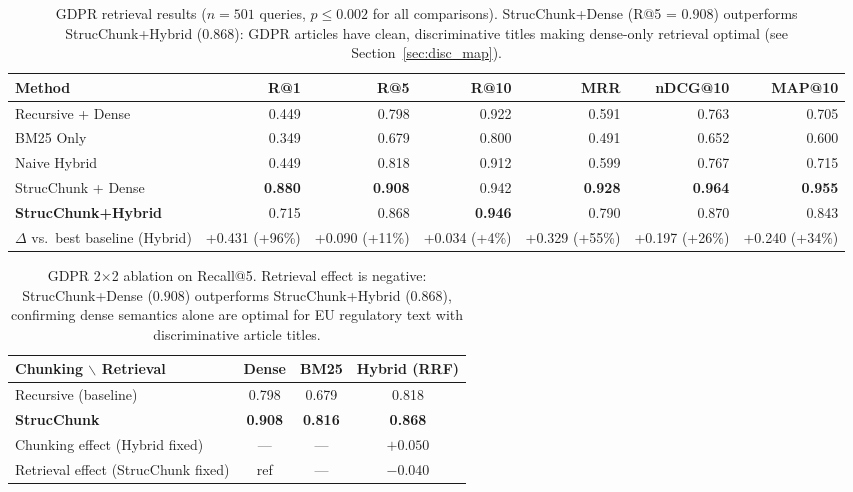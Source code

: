 \documentclass[sn-mathphys,Numbered]{sn-jnl}%
\begin{document}
\begin{table}[htbp]
\centering
\begin{adjustbox}{max width=\textwidth}
\begin{tabular}{lrrrrrr}
\toprule
\textbf{Method} & \textbf{R@1} & \textbf{R@5} & \textbf{R@10}
               & \textbf{MRR} & \textbf{nDCG@10} & \textbf{MAP@10} \\
\midrule
Recursive + Dense       & 0.449 & 0.798 & 0.922 & 0.591 & 0.763 & 0.705 \\
BM25 Only               & 0.349 & 0.679 & 0.800 & 0.491 & 0.652 & 0.600 \\
Naive Hybrid            & 0.449 & 0.818 & 0.912 & 0.599 & 0.767 & 0.715 \\
StrucChunk + Dense      & \textbf{0.880} & \textbf{0.908}
                        & 0.942 & \textbf{0.928}
                        & \textbf{0.964} & \textbf{0.955} \\
\textbf{StrucChunk+Hybrid}  & 0.715 & 0.868 & \textbf{0.946}
                        & 0.790 & 0.870 & 0.843 \\
\midrule
$\Delta$ vs.\ best baseline (Hybrid) & +0.431 (+96\%) & +0.090 (+11\%)
                        & +0.034 (+4\%) & +0.329 (+55\%)
                        & +0.197 (+26\%) & +0.240 (+34\%) \\
\bottomrule
\end{tabular}
\end{adjustbox}
\caption{GDPR retrieval results ($n=501$ queries, $p \leq 0.002$ for all
  comparisons).  StrucChunk+Dense (R@5 = 0.908) outperforms
  StrucChunk+Hybrid (0.868): GDPR articles have clean, discriminative titles
  making dense-only retrieval optimal (see Section~\ref{sec:disc_map}).}
\label{tab:gdpr_results}
\end{table}

\begin{table}[htbp]
\centering
\begin{tabular}{lccc}
\toprule
\textbf{Chunking $\backslash$ Retrieval} & \textbf{Dense}
  & \textbf{BM25} & \textbf{Hybrid (RRF)} \\
\midrule
Recursive (baseline)            & 0.798 & 0.679 & 0.818 \\
\textbf{StrucChunk}             & \textbf{0.908} & \textbf{0.816} & \textbf{0.868} \\
\midrule
Chunking effect (Hybrid fixed)  & ---   & ---   & $+0.050$ \\
Retrieval effect (StrucChunk fixed) & ref & ---  & $-0.040$ \\
\bottomrule
\end{tabular}
\caption{GDPR 2$\times$2 ablation on Recall@5.  Retrieval effect is
  negative: StrucChunk+Dense ($0.908$) outperforms StrucChunk+Hybrid
  ($0.868$), confirming dense semantics alone are optimal for EU regulatory
  text with discriminative article titles.}
\label{tab:gdpr_ablation}
\end{table}
\end{document}
